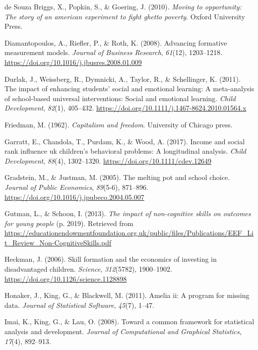 \documentclass[
  english,
  man]{apa6}
\newlength{\cslhangindent}
\newenvironment{cslreferences}%
  {\setlength{\parindent}{0pt}%
  \everypar{\setlength{\hangindent}{\cslhangindent}}\ignorespaces}%
  {\par}
\begin{document}
\begin{cslreferences}
\leavevmode\hypertarget{ref-desouzabriggs2010}{}%
de Souza Briggs, X., Popkin, S., \& Goering, J. (2010). \emph{Moving to opportunity: The story of an american experiment to fight ghetto poverty}. Oxford University Press.

\leavevmode\hypertarget{ref-diamantopoulos2008}{}%
Diamantopoulos, A., Riefler, P., \& Roth, K. (2008). Advancing formative measurement models. \emph{Journal of Business Research}, \emph{61}(12), 1203--1218. \url{https://doi.org/10.1016/j.jbusres.2008.01.009}

\leavevmode\hypertarget{ref-durlak2011}{}%
Durlak, J., Weissberg, R., Dymnicki, A., Taylor, R., \& Schellinger, K. (2011). The impact of enhancing students' social and emotional learning: A meta-analysis of school-based universal interventions: Social and emotional learning. \emph{Child Development}, \emph{82}(1), 405--432. \url{https://doi.org/10.1111/j.1467-8624.2010.01564.x}

\leavevmode\hypertarget{ref-friedman1962}{}%
Friedman, M. (1962). \emph{Capitalism and freedom}. University of Chicago press.

\leavevmode\hypertarget{ref-garratt2017}{}%
Garratt, E., Chandola, T., Purdam, K., \& Wood, A. (2017). Income and social rank influence uk children's behavioral problems: A longitudinal analysis. \emph{Child Development}, \emph{88}(4), 1302--1320. \url{https://doi.org/10.1111/cdev.12649}

\leavevmode\hypertarget{ref-gradstein2005}{}%
Gradstein, M., \& Justman, M. (2005). The melting pot and school choice. \emph{Journal of Public Economics}, \emph{89}(5-6), 871--896. \url{https://doi.org/10.1016/j.jpubeco.2004.05.007}

\leavevmode\hypertarget{ref-gutman2013}{}%
Gutman, L., \& Schoon, I. (2013). \emph{The impact of non-cognitive skills on outcomes for young people} (p. 2019). Retrieved from \url{https://educationendowmentfoundation.org.uk/public/files/Publications/EEF_Lit_Review_Non-CognitiveSkills.pdf}

\leavevmode\hypertarget{ref-heckman2006}{}%
Heckman, J. (2006). Skill formation and the economics of investing in disadvantaged children. \emph{Science}, \emph{312}(5782), 1900--1902. \url{https://doi.org/10.1126/science.1128898}

\leavevmode\hypertarget{ref-honaker2011}{}%
Honaker, J., King, G., \& Blackwell, M. (2011). Amelia ii: A program for missing data. \emph{Journal of Statistical Software}, \emph{45}(7), 1--47.

\leavevmode\hypertarget{ref-imai2008}{}%
Imai, K., King, G., \& Lau, O. (2008). Toward a common framework for statistical analysis and development. \emph{Journal of Computational and Graphical Statistics}, \emph{17}(4), 892--913.


\end{cslreferences}
\end{document}

